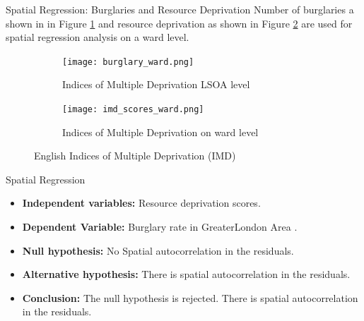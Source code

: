 \documentclass[10pt, aspectratio=169]{beamer}
\begin{document}
\begin{frame}{Spatial Regression: Burglaries and Resource Deprivation}
    Number of burglaries a shown in in Figure \ref{fig:burglary_ward} and resource deprivation as shown
    in Figure \ref{fig:imd_scores_ward} are used for spatial regression analysis on a ward level.
    \begin{figure}
        \centering
            \begin{subfigure}[t]{0.4\textwidth}
                \texttt{[image: burglary\_ward.png]}
                \caption{Indices of Multiple Deprivation LSOA level}\label{fig:burglary_ward}
            \end{subfigure}
            \begin{subfigure}[t]{0.4\textwidth}
                \texttt{[image: imd\_scores\_ward.png]}
                \caption{Indices of Multiple Deprivation on ward level}\label{fig:imd_scores_ward}
            \end{subfigure}
        \caption{English Indices of Multiple Deprivation (IMD)}\label{fig:burg_imd}
    \end{figure}
\end{frame}


\begin{frame}{Spatial Regression}
    
    \small\begin{table}[!h]
        
        \caption{\label{tab:ols_summary} Estimation results of regression.}
    \end{table}
    \begin{itemize}
        \item \textbf{Independent variables:} Resource deprivation scores.
        \item \textbf{Dependent Variable:} Burglary rate in GreaterLondon Area .
        \item \textbf{Null hypothesis:} No Spatial autocorrelation in the residuals.
        \item \textbf{Alternative hypothesis:} There is spatial autocorrelation in the residuals. 
        \item \textbf{Conclusion:} The null hypothesis is rejected. There is spatial autocorrelation in the residuals.
    \end{itemize}
\end{frame}
\end{document}
